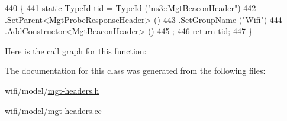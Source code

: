 \begin{DoxyCode}
440 \{
441   \textcolor{keyword}{static} TypeId tid = TypeId (\textcolor{stringliteral}{"ns3::MgtBeaconHeader"})
442     .SetParent<\hyperlink{classns3_1_1MgtProbeResponseHeader_aa100c4cac84d15dfc50c7aa6ee2e5c9b}{MgtProbeResponseHeader}> ()
443     .SetGroupName (\textcolor{stringliteral}{"Wifi"})
444     .AddConstructor<MgtBeaconHeader> ()
445   ;
446   \textcolor{keywordflow}{return} tid;
447 \}
\end{DoxyCode}


Here is the call graph for this function\+:




The documentation for this class was generated from the following files\+:\begin{DoxyCompactItemize}
\item 
wifi/model/\hyperlink{mgt-headers_8h}{mgt-\/headers.\+h}\item 
wifi/model/\hyperlink{mgt-headers_8cc}{mgt-\/headers.\+cc}\end{DoxyCompactItemize}
